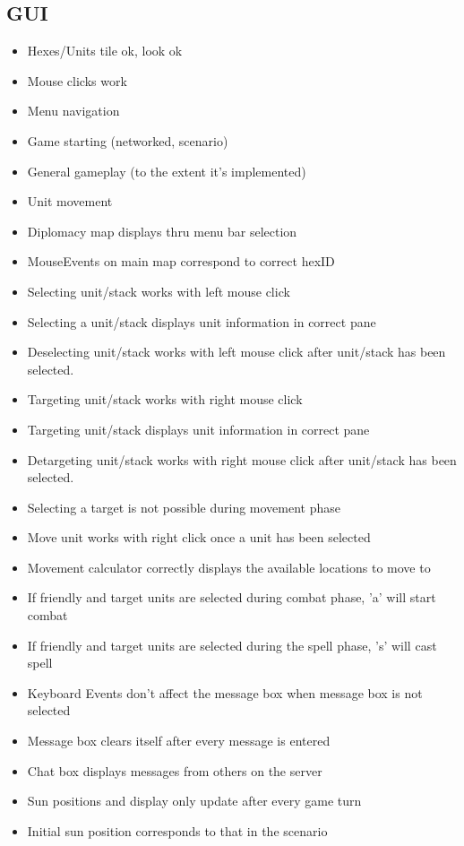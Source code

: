 {\subsection{GUI}
\begin{itemize}
\item Hexes/Units tile ok, look ok
\item Mouse clicks work
\item Menu navigation
\item Game starting (networked, scenario)
\item General gameplay (to the extent it's implemented)
\item Unit movement
\item Diplomacy map displays thru menu bar selection
\item MouseEvents on main map correspond to correct hexID
\item Selecting unit/stack works with left mouse click
\item Selecting a unit/stack displays unit information in correct pane
\item Deselecting unit/stack works with left mouse click after unit/stack has been selected.
\item Targeting unit/stack works with right mouse click
\item Targeting unit/stack displays unit information in correct pane
\item Detargeting unit/stack works with right mouse click after unit/stack has been selected.
\item Selecting a target is not possible during movement phase
\item Move unit works with right click once a unit has been selected
\item Movement calculator correctly displays the available locations to move to
\item If friendly and target units are selected during combat phase, 'a' will start combat
\item If friendly and target units are selected during the spell phase, 's' will cast spell
\item Keyboard Events don't affect the message box when message box is not selected
\item Message box clears itself after every message is entered
\item Chat box displays messages from others on the server
\item Sun positions and display only update after every game turn
\item Initial sun position corresponds to that in the scenario
\end{itemize}


}
